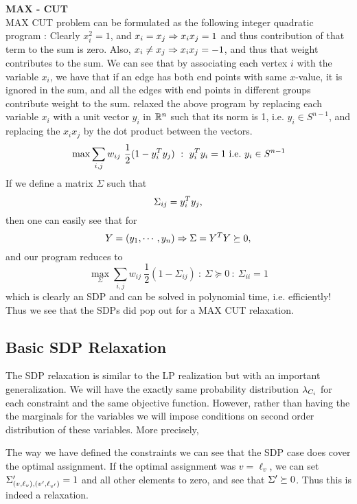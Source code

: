 \begin{example}{\bf MAX - CUT}\label{maxcut}\\
MAX CUT problem can be formulated as the following integer quadratic program : 
Clearly $x_i^2=1$, and $x_i=x_j\Rightarrow x_ix_j=1$ and thus contribution of that term to the sum is zero. 
Also, $x_i \neq x_j \Rightarrow x_ix_j=-1$, and thus that weight contributes to the sum. 
We can see that by associating each vertex $i$ with the variable $x_i$, we have that if an edge has both end points with same $x$-value, it is ignored in the sum, and all the edges with end points in different groups contribute weight to the sum. 
\cite{DelormePoljak90} relaxed the above program by replacing each variable $x_i$ with a unit vector $y_i$ in $\mathbb{R}^n$ such that its norm is 1, i.e. $y_i \in S^{n-1}$, and replacing the $x_ix_j$ by the dot product between the vectors. 
\[ \max \sum_{i,j} w_{ij} \ \frac{1}{2}(1-y_i^T y_j) ~:~ y_i^T y_i = 1 {\mbox {\ i.e.\ }} y_i \in S^{n-1} \]
If we define a matrix $\Sigma$ such that $$\Sigma_{ij} = y_i^T y_j,$$ then one can easily see that for $$Y = (y_1, \cdots, y_n) \Rightarrow \Sigma = Y^T Y \succeq 0,$$ and our program reduces to 
\[ \max_\Sigma \sum_{i,j} w_{ij} \ \frac{1}{2}(1-\Sigma_{ij}) ~:~ \Sigma \succeq 0 ~:~ \Sigma_{ii} = 1  \]
which is clearly an SDP and can be solved in polynomial time, i.e. efficiently! 
Thus we see that the SDPs did pop out for a MAX CUT relaxation.
\end{example}

\subsection{Basic SDP Relaxation}

The SDP relaxation is similar to the LP realization but with an important generalization. 
We will have the exactly same probability distribution $\lambda_{C_i}$ for each constraint and the same objective function. 
However, rather than having the the marginals for the variables we will impose conditions on second order distribution of these variables. 
More precisely,

The way we have defined the constraints we can see that the SDP case does cover the optimal assignment. 
If the optimal assignment was $v=\ell_v$, we can set $ \Sigma'_{\left(v, \ell_v\right),\left(v', \ell_{v'}\right)} = 1$ and all other elements to zero, and see that $\Sigma' \succeq 0$. 
Thus this is indeed a relaxation.


